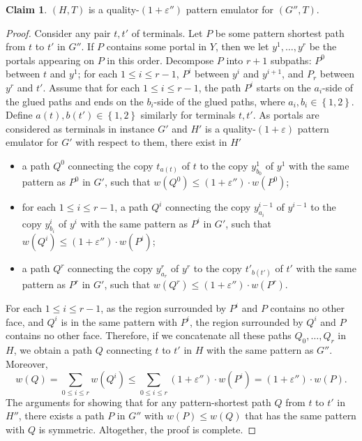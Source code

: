 \documentclass[11pt]{article}
\theoremstyle{definition}
\newtheorem{claim}[theorem]{Claim}
\newcommand{\set}[1]{\left\{ #1 \right\}}
\newcommand{\eps}{{\varepsilon}}
\begin{document}
\begin{claim}
\label{clm: cut glue emulator}
$(H,T)$ is a quality-$(1+\eps'')$ pattern emulator for $(G'',T)$.
\end{claim}
\begin{proof}
Consider any pair $t,t'$ of terminals. 
Let $P$ be some pattern shortest path from $t$ to $t'$ in $G''$.
If $P$ contains some portal in $Y$, then we let $y^1,\ldots,y^r$ be the portals appearing on $P$ in this order.
Decompose $P$ into $r+1$ subpaths: $P^0$ between $t$ and $y^1$; for each $1\le i\le r-1$, $P^i$ between $y^{i}$ and $y^{i+1}$, and $P_r$ between $y^{r}$ and $t'$.
Assume that for each $1\le i\le r-1$, the path $P^i$ starts on the $a_i$-side of the glued paths and ends on the $b_i$-side of the glued paths, where $a_i,b_i\in \set{1,2}$. Define $a(t), b(t')\in \set{1,2}$ similarly for terminals $t,t'$.
As portals are considered as terminals in instance $G'$ and $H'$ is a quality-$(1+\eps)$ pattern emulator for $G'$ with respect to them, there exist in $H'$ 
\begin{itemize}
\item a path $Q^0$ connecting the copy $t_{a(t)}$ of $t$ to the copy $y^1_{b_0}$ of $y^1$ with the same pattern as $P^0$ in $G'$, such that $w(Q^0)\le (1+\eps'')\cdot w(P^0)$;
\item for each $1\le i\le r-1$, a path $Q^i$ connecting the copy $y^{i-1}_{a_{i}}$ of $y^{i-1}$ to the copy $y^{i}_{b_i}$ of $y^i$ with the same pattern as $P^i$ in $G'$, such that $w(Q^i)\le (1+\eps'')\cdot w(P^i)$;
\item a path $Q^r$ connecting the copy $y^r_{a_r}$ of $y^r$ to the copy $t'_{b(t')}$ of $t'$ with the same pattern as $P^r$ in $G'$, such that $w(Q^r)\le (1+\eps'')\cdot w(P^r)$.
\end{itemize}

For each $1\le i\le r-1$, as the region surrounded by $P^i$ and $P$ contains no other face, and $Q^i$ is in the same pattern with $P^i$, the region surrounded by $Q^i$ and $P$ contains no other face. Therefore, if we concatenate all these paths $Q_0,\ldots,Q_r$ in $H$, we obtain a path $Q$ connecting $t$ to $t'$ in $H$ with the same pattern as $G''$. Moreover,
\[w(Q)=\sum_{0\le i\le r}w(Q^i)\le \sum_{0\le i\le r}(1+\eps'')\cdot w(P^i)=(1+\eps'')\cdot w(P).\]
The arguments for showing that for any pattern-shortest path $Q$ from $t$ to $t'$ in $H''$, there exists a path $P$ in $G''$ with $w(P)\le w(Q)$ that has the same pattern with $Q$ is symmetric. Altogether, the proof is complete.
\end{proof}
\end{document}
